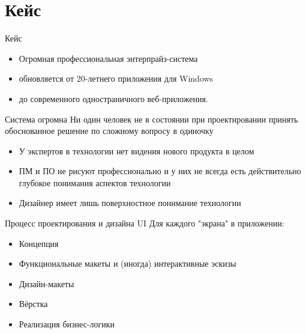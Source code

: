 \documentclass[aspectratio=169,handout,bigger]{beamer}
\begin{document}
\section{Кейс}

\begin{frame}{Кейс}
  \begin{itemize}
    \item Огромная профессиональная энтерпрайз-система
    \item обновляется от 20-летнего приложения для Windows
    \item до современного одностраничного веб-приложения.
  \end{itemize}
\end{frame}


\begin{frame}{Система огромна}
  Ни один человек не в состоянии при проектировании принять обоснованное решение
  по сложному вопросу в одиночку

  \begin{itemize}
    \item У экспертов в технологии нет видения нового продукта в целом
    \item ПМ и ПО не рисуют профессионально
          и у них не всегда есть действительно глубокое понимания
          аспектов технологии
    \item Дизайнер имеет лишь поверхностное понимание технологии
  \end{itemize}
\end{frame}


\begin{frame}{Процесс проектирования и дизайна UI}
  Для каждого "экрана" в приложении:

  \begin{itemize}
    \item Концепция
    \item Функциональные макеты и (иногда) интерактивные эскизы
    \item Дизайн-макеты
    \item Вёрстка
    \item Реализация бизнес-логики
  \end{itemize}
\end{frame}
\end{document}
